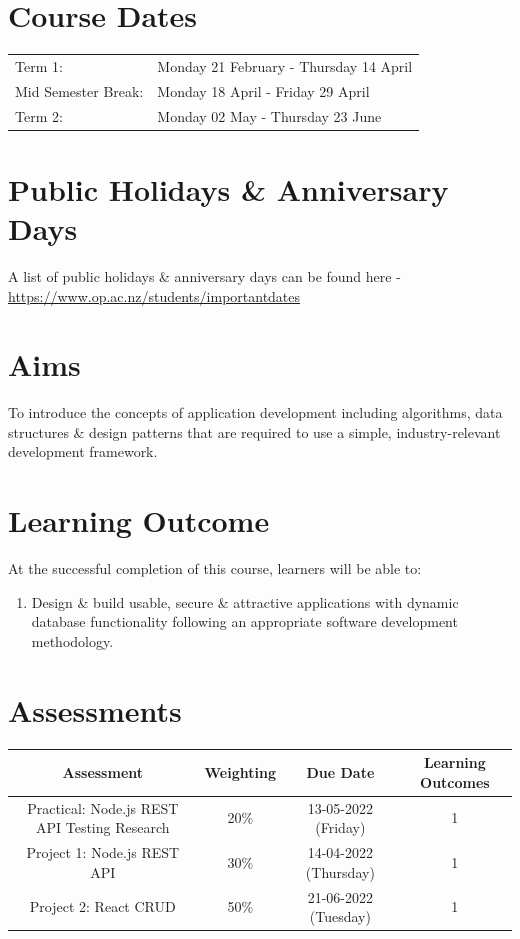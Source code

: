 \documentclass{article}
\begin{document}
\section*{Course Dates}
\begin{tabular}{ll}
	Term 1:             & Monday 21 February - Thursday 14 April \\
	Mid Semester Break: & Monday 18 April - Friday 29 April      \\
	Term 2:             & Monday 02 May - Thursday 23 June       \\
\end{tabular}

\section*{Public Holidays \& Anniversary Days}
A list of public holidays \& anniversary days can be found here - \href{https://www.op.ac.nz/students/importantdates}{https://www.op.ac.nz/students/importantdates}

\section*{Aims}
To introduce the concepts of application development including algorithms, data structures \& design patterns that are required to use a simple, industry-relevant development framework.

\section*{Learning Outcome}
At the successful completion of this course, learners will be able to:
\begin{enumerate}
	\item Design \& build usable, secure \& attractive applications with dynamic database functionality following an appropriate software development methodology.
\end{enumerate}

\section*{Assessments}
\renewcommand{\arraystretch}{1.5}
\begin{tabular}{|c|c|c|c|}
	\hline
	\textbf{Assessment}                                 & \textbf{Weighting} & \textbf{Due Date}            & \textbf{Learning Outcomes} \\ \hline
	\small Practical: Node.js REST API Testing Research & \small 20\%        & \small 13-05-2022 (Friday)   & \small 1                   \\ \hline
	\small Project 1: Node.js REST API                  & \small 30\%        & \small 14-04-2022 (Thursday) & \small 1                   \\ \hline
	\small Project 2: React CRUD                        & \small 50\%        & \small 21-06-2022 (Tuesday)  & \small 1                   \\ \hline
\end{tabular}
\end{document}
